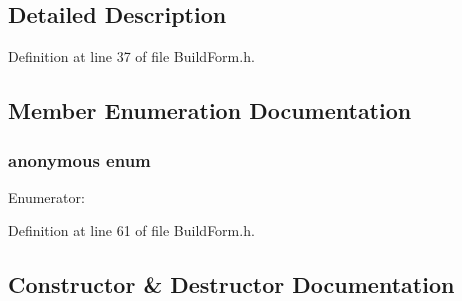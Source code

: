 \subsection{Detailed Description}




Definition at line 37 of file Build\-Form.h.

\subsection{Member Enumeration Documentation}
\subsubsection{\setlength{\rightskip}{0pt plus 5cm}anonymous enum\hspace{0.3cm}{\tt  [private]}}\label{class_build_form_da2b589b527d0be91b7f344f5209d5b2}


\begin{Desc}
\item[Enumerator: ]\par
\begin{description}
\item[{\em 
ID\_\-WXGAUGE1\label{class_build_form_da2b589b527d0be91b7f344f5209d5b29e0598a1d7d7cf170bcc58c0d57f5017}
}]\item[{\em 
ID\_\-WXSTATICBOX1\label{class_build_form_da2b589b527d0be91b7f344f5209d5b2741e8747b9a3a0c310fab06081937ecd}
}]\item[{\em 
ID\_\-DUMMY\_\-VALUE\_\-\label{class_build_form_da2b589b527d0be91b7f344f5209d5b2220eacc89552581687d63d839f3c4427}
}]\end{description}
\end{Desc}



Definition at line 61 of file Build\-Form.h.

\subsection{Constructor \& Destructor Documentation}
